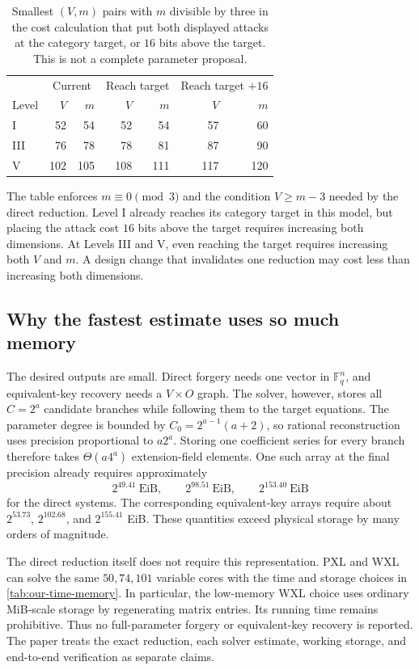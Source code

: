 \documentclass[11pt,a4paper]{article}
\theoremstyle{definition}
\theoremstyle{remark}
\newcommand{\F}{\mathbb F}
\begin{document}
\begin{table}[H]
\centering
\small
\caption{Smallest $(V,m)$ pairs with $m$ divisible by three in the cost calculation
that put both displayed attacks at the category target, or $16$ bits above the
target.  This is not a complete parameter proposal.}
\label{tab:combined-retuning}
\begin{tabular}{@{}lrrrrrr@{}}
\toprule
& \multicolumn{2}{c}{Current} & \multicolumn{2}{c}{Reach target} & \multicolumn{2}{c}{Reach target $+16$}\\
Level & $V$ & $m$ & $V$ & $m$ & $V$ & $m$\\
\midrule
I&52&54&52&54&57&60\\
III&76&78&78&81&87&90\\
V&102&105&108&111&117&120\\
\bottomrule
\end{tabular}
\end{table}

The table enforces $m\equiv0\pmod3$ and the condition $V\ge m-3$ needed by the
direct reduction.  Level I already reaches its category target in this model,
but placing the attack cost $16$ bits above the target requires increasing
both dimensions.  At Levels III and V, even reaching the target requires
increasing both $V$ and $m$.  A design change that invalidates one reduction
may cost less than increasing both dimensions.

\subsection{Why the fastest estimate uses so much memory}\label{subsec:memory-new}
The desired outputs are small.  Direct forgery needs one vector in $\F_q^n$,
and equivalent-key recovery needs a $V\times O$ graph.  The solver, however,
stores all $C=2^a$ candidate branches while following them to the target
equations.  The parameter degree is bounded by
$C_0=2^{a-1}(a+2)$, so rational reconstruction uses precision proportional to
$a2^a$.  Storing one coefficient series for every branch therefore takes
$\Theta(a4^a)$ extension-field elements.  One such array at the final
precision already requires
approximately
\[
 2^{49.41}\ \mathrm{EiB},
 \qquad2^{98.51}\ \mathrm{EiB},
 \qquad2^{153.40}\ \mathrm{EiB}
\]
for the direct systems.  The corresponding equivalent-key arrays require
about $2^{53.73}$, $2^{102.68}$, and $2^{155.41}$ EiB.  These quantities exceed
physical storage by many orders of magnitude.

The direct reduction itself does not require this representation.  PXL and WXL
can solve the same $50,74,101$ variable cores with the time and storage choices
in \cref{tab:our-time-memory}.  In particular, the low-memory WXL
choice uses ordinary MiB-scale storage by regenerating matrix entries.  Its
running time remains prohibitive.  Thus no full-parameter forgery or
equivalent-key recovery is reported.  The paper treats the exact reduction,
each solver estimate, working storage, and end-to-end verification as separate
claims.
\end{document}
